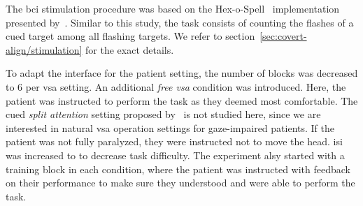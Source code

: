 The \ac{bci} stimulation procedure was based on the
Hex-o-Spell~\cite{Treder2010} implementation presented
by~\textcite{VanDenKerchove2024}.
Similar to this study, the task consists of counting the flashes of a cued
target among all flashing targets.
We refer to section~\ref{sec:covert-align/stimulation} for the exact details.

To adapt the interface for the patient setting, the number of blocks was
decreased to 6 per \ac{vsa} setting.
An additional \emph{free \ac{vsa}} condition was introduced.
Here, the patient was instructed to perform the task as they deemed most
comfortable.
The cued \emph{split attention} setting proposed
by~\textcite{VanDenKerchove2024} is not studied here, since we are interested
in natural \ac{vsa} operation settings for gaze-impaired patients.
If the patient was not fully paralyzed, they were instructed not to move the head.
\Ac{isi} was increased to to decrease task difficulty.
The experiment alsy started with a training block in each condition, where the
patient was instructed with feedback on their performance to make sure they
understood and were able to perform the task.

